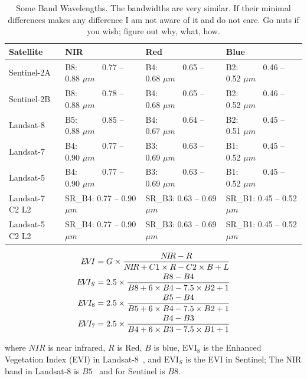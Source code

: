 \begin{table}[]
\centering
\caption{Some Band Wavelengths. The bandwidths are very similar. If their
minimal differences makes any difference I am not aware of it and do not care. 
Go nuts if you wish; figure out why, what, how.} 
\label{tab:SomeBandWavelengths}
\begin{tabular}{|l|l|l|l|}
\hline
\rowcolor{shadecolor} 
\small{Satellite} & 
\small{NIR} & 
\small{Red}  &
\small{Blue} \\
\hline
Sentinel-2A & B8:~~~~~~0.77 -- 0.88 $\mu m$ & B4:~~~~~~0.65 -- 0.68 $\mu m$ & B2:~~~~~~0.46 -- 0.52 $\mu m$\\ 
\hline
\rowcolor{aliceblue} 
Sentinel-2B & B8:~~~~~~0.78 -- 0.88 $\mu m$ & B4:~~~~~~0.65 -- 0.68 $\mu m$ & B2:~~~~~~0.46 -- 0.52 $\mu m$ \\ 
\hline
Landsat-8 & B5:~~~~~~0.85 -- 0.88 $\mu m$ & B4:~~~~~~0.64 -- 0.67 $\mu m$ & B2:~~~~~~0.45 -- 0.51 $\mu m$\\ 
\hline
\rowcolor{aliceblue} 
Landsat-7 & B4:~~~~~~0.77 -- 0.90 $\mu m$ & B3:~~~~~~0.63 -- 0.69 $\mu m$ & B1:~~~~~~0.45 -- 0.52 $\mu m$\\ 
\hline
Landsat-5 & B4:~~~~~~0.77 -- 0.90 $\mu m$  & B3:~~~~~~0.63 -- 0.69 $\mu m$ & B1:~~~~~~0.45 -- 0.52 $\mu m$\\ 
\hline
\rowcolor{aliceblue} 
Landsat-7 C2 L2 & SR\_B4: 0.77 -- 0.90 $\mu m$ & SR\_B3: 0.63 -- 0.69 $\mu m$ & SR\_B1: 0.45 -- 0.52 $\mu m$\\ 
\hline
Landsat-5 C2 L2 & SR\_B4: 0.77 -- 0.90 $\mu m$ & SR\_B3: 0.63 -- 0.69 $\mu m$ & SR\_B1: 0.45 -- 0.52 $\mu m$\\ 
\hline
\end{tabular}
\end{table}


\begin{gather}
\label{eq:EVILandsat8}
\begin{aligned}
\EVI &= G \times \frac{\NIR - R}{\NIR + C1 \times R - C2 \times B + L} \\
\EVI_S &= 2.5 \times \frac{B8 - B4}{B8 + 6 \times B4 - 7.5 \times B2 + 1}\\
\EVI_8 &= 2.5 \times \frac{B5 - B4}{B5 + 6 \times B4 - 7.5 \times B2 + 1} \\
\EVI_7 &= 2.5 \times \frac{B4 - B3}{B4 + 6 \times B3 - 7.5 \times B1 + 1}
\end{aligned}
\end{gather} 

\noindent where $NIR$ is near infrared, $R$ is Red,
$B$ is blue, 
$\text{EVI}_8$ is the Enhanced Vegetation Index (EVI) 
in Landsat-8~\citep{Landsat8EVI}, 
and $\text{EVI}_S$
is the EVI in Sentinel; The NIR band in
Landsat-8 is $B5$~\citep{L8BandNames}
and for Sentinel is $B8$.

